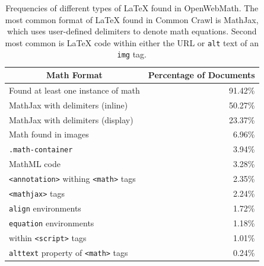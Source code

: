 \begin{table}[t]
\begin{center}
\begin{tabular}{lr}
\multicolumn{1}{c}{\bf Math Format} & \multicolumn{1}{c}{\bf Percentage of Documents} \\
\midrule
Found at least one instance of math  & 91.42\% \\
MathJax with delimiters (inline) & 50.27\% \\
MathJax with delimiters (display) & 23.37\% \\
Math found in images & 6.96\% \\
\texttt{.math-container} & 3.94\% \\
MathML code & 3.28\% \\
\texttt{<annotation>} withing \texttt{<math>} tags & 2.35\% \\
\texttt{<mathjax>} tags & 2.24\% \\
\texttt{align} environments & 1.72\% \\
\texttt{equation} environments & 1.18\% \\
within \texttt{<script>} tags & 1.01\% \\
\texttt{alttext} property of \texttt{<math>} tags & 0.24\% \\
\end{tabular}
\end{center}
\caption{Frequencies of different types of \LaTeX{} found in OpenWebMath. The most common format of \LaTeX{} found in Common Crawl is MathJax, which uses user-defined delimiters to denote math equations. Second most common is \LaTeX{} code within either the URL or \texttt{alt} text of an \texttt{img} tag.}
\label{table:latex-types}
\end{table}